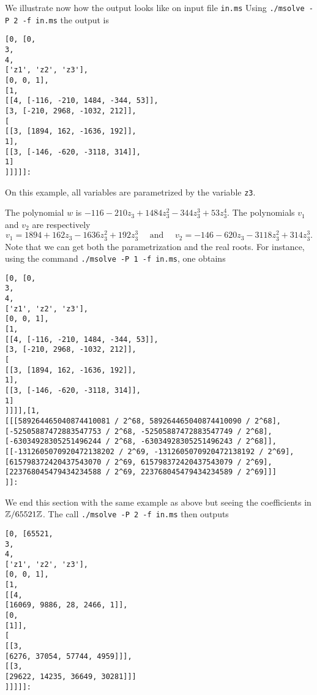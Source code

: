 \documentclass[a4paper,english,11pt]{scrartcl}
\theoremstyle{definition}
\theoremstyle{remark}
\begin{document}
We illustrate now how the output looks like on input file \verb+in.ms+
Using \verb+./msolve -P 2 -f in.ms+ the output is 
\begin{tcolorbox}
  \begin{lstlisting}
[0, [0, 
3, 
4, 
['z1', 'z2', 'z3'],
[0, 0, 1],
[1,
[[4, [-116, -210, 1484, -344, 53]],
[3, [-210, 2968, -1032, 212]],
[
[[3, [1894, 162, -1636, 192]],
1],
[[3, [-146, -620, -3118, 314]],
1]
]]]]]:
  \end{lstlisting}
\end{tcolorbox}
On this example, all variables are parametrized by the variable \verb+z3+. 

The polynomial $w$ is $-116 - 210 z_3 + 1484 z_3^2 -344 z_3^3 + 53 z_3^4$. 
The polynomials $v_1$ and $v_2$ are respectively 
\[
    v_1 = 1894 + 162 z_3 - 1636 z_3^2 + 192 z_3^3 \quad \text{ and } 
    \quad v_2 = -146 -620 z_3 - 3118 z_3^2 + 314 z_3^3.
\]
Note that we can get both the parametrization and the real roots.
For instance, using the command 
\verb+./msolve -P 1 -f in.ms+, one obtains
\begin{tcolorbox}
  \begin{lstlisting}
[0, [0, 
3, 
4, 
['z1', 'z2', 'z3'],
[0, 0, 1],
[1,
[[4, [-116, -210, 1484, -344, 53]],
[3, [-210, 2968, -1032, 212]],
[
[[3, [1894, 162, -1636, 192]],
1],
[[3, [-146, -620, -3118, 314]],
1]
]]]],[1,
[[[589264465040874410081 / 2^68, 589264465040874410090 / 2^68], [-52505887472883547753 / 2^68, -52505887472883547749 / 2^68], [-63034928305251496244 / 2^68, -63034928305251496243 / 2^68]], [[-1312605070920472138202 / 2^69, -1312605070920472138192 / 2^69], [615798372420437543070 / 2^69, 615798372420437543079 / 2^69], [223768045479434234588 / 2^69, 223768045479434234589 / 2^69]]]
]]:
  \end{lstlisting}
\end{tcolorbox}

We end this section with the same example as above but seeing the coefficients in 
\(\mathbb{Z}/65521\mathbb{Z}\).
The call \verb+./msolve -P 2 -f in.ms+ then outputs
\begin{tcolorbox}
  \begin{lstlisting}
[0, [65521, 
3, 
4, 
['z1', 'z2', 'z3'],
[0, 0, 1],
[1,
[[4,
[16069, 9886, 28, 2466, 1]],
[0,
[1]],
[
[[3,
[6276, 37054, 57744, 4959]]],
[[3,
[29622, 14235, 36649, 30281]]]
]]]]]:
  \end{lstlisting}
\end{tcolorbox}
\end{document}

